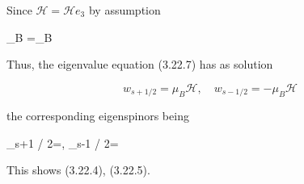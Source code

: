 \documentclass{article}
\begin{document}
Since $\mathcal{H}=\mathcal{H} e_{3}$ by assumption
 
\mu_{B} \boldsymbol{\sigma} \cdot {}=\mu_{B} 
 

Thus, the eigenvalue equation (3.22.7) has as solution
 
\begin{equation*}
w_{s+1 / 2}=\mu_{B} \mathcal{H}, \quad w_{s-1 / 2}=-\mu_{B} \mathcal{H} \tag{3.22.11}
\end{equation*}
 
the corresponding eigenspinors being
 
\phi_{s+1 / 2}=, \quad \phi_{s-1 / 2}=\left[\begin{array}{l}
0 \\
1
\end{array}\right]
 

This shows (3.22.4), (3.22.5).
\end{document}
